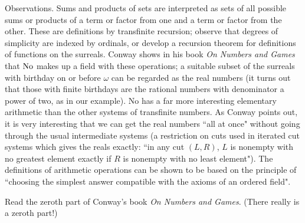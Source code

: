 \begin{ThmEtc}{Observations.}
 Sums and products of sets are interpreted as sets of all
 possible sums or products of a term or factor from one and a term or
 factor from the other.  These are definitions by
 transfinite 
 recursion; observe that degrees of simplicity are indexed by
 ordinals, or develop a recursion theorem for
 definitions of functions on the surreals.  Conway
 shows in his book {\itshape On Numbers and Games\/} that $\mathrm{No}$ makes up a
 field with these operations; a suitable subset of the
 surreals with birthday on or before $\omega$ can be regarded as the
 real numbers (it turns out that those with finite
 birthdays are the 
 rational numbers with denominator a power of
 two, as in our example). 
 No has a far more interesting elementary arithmetic than the other
 systems of transfinite numbers.  As Conway points
 out, it is very interesting that we can get the real numbers ``all at once" without going through the usual intermediate systems
 (a restriction on cuts 
 used in iterated cut systems which gives the reals exactly: ``in any
 cut $(L,R)$, $L$ is nonempty with no greatest element exactly if $R$
 is nonempty with no least element").  The definitions of arithmetic
 operations can be shown to be based on the principle of ``choosing the
 simplest answer compatible with the axioms of an ordered field".
\end{ThmEtc}



\Exercise

Read the zeroth part of Conway's book {\itshape On Numbers and
Games\/}.  (There really is a zeroth part!) 
